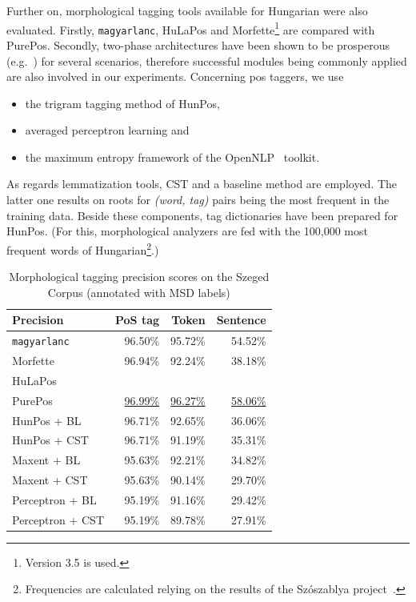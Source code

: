 Further on, morphological tagging tools available for Hungarian were also evaluated. 
Firstly, \texttt{magyarlanc}, HuLaPos and Morfette\footnote{Version 3.5 is used.} are compared with PurePos.  
Secondly, two-phase architectures have been shown to be prosperous (e.g.~\cite{Agic2013,Erjavec2004}) for several scenarios, therefore successful modules being commonly applied are also involved in our experiments. 
Concerning \gls{pos} taggers, we use
\begin{itemize}
  \item the trigram tagging method of HunPos,
  \item averaged perceptron learning and
  \item the maximum entropy framework of the OpenNLP~\cite{Baldridge2002} toolkit.
\end{itemize}

As regards lemmatization tools, CST and a baseline method are employed. 
The latter one results on roots for \emph{(word, tag)} pairs being the most frequent in the training data. 
Beside these components, tag dictionaries have been prepared for HunPos. 
(For this, morphological analyzers are fed with the 100,000 most frequent words of Hungarian\footnote{Frequencies are calculated relying on the results of the Szószablya project~\cite{Halacsy2004}.}.)

\begin{table}[H]
 \centering
 \caption{Morphological tagging precision scores on the Szeged Corpus (annotated with MSD labels)}
\begin{tabular}{l r r r}
  \hline
  Precision &  PoS tag &  Token &  Sentence \\
  \hline
  \texttt{magyarlanc} &  96.50\% &  95.72\% &  54.52\% \\
  Morfette &  96.94\% &  92.24\% &  38.18\% \\
  HuLaPos &   &   &   \\
  PurePos &  \underline{96.99\%} &  \underline{96.27\%} &  \underline{58.06\%} \\
  HunPos + BL &  96.71\% &  92.65\% &  36.06\% \\
  HunPos + CST &  96.71\% &  91.19\% &  35.31\% \\
  Maxent + BL &  95.63\% &  92.21\% &  34.82\% \\
  Maxent + CST &  95.63\% &  90.14\% &  29.70\% \\
  Perceptron + BL &  95.19\% &  91.16\% &  29.42\% \\
  Perceptron + CST &  95.19\% &  89.78\% &  27.91\% \\
  \hline
\end{tabular}
\label{tab:morphtag-orig}
\end{table}


